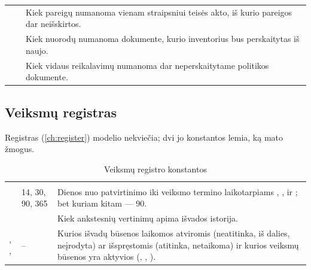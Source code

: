 \begin{xltabular}{\textwidth}{@{}L{44mm}L{19mm}Y@{}}
 &  & Kiek pareigų numanoma vienam straipsniui teisės akto, iš kurio pareigos dar neišskirtos. \\
 &  & Kiek nuorodų numanoma dokumente, kurio inventorius bus perskaitytas iš naujo. \\
 &  & Kiek vidaus reikalavimų numanoma dar neperskaitytame politikos dokumente. \\
\end{xltabular}


\subsection{Veiksmų registras}\label{sec:config:register}

Registras (\cref{ch:register}) modelio nekviečia; dvi jo konstantos lemia, ką mato žmogus.

\begin{xltabular}{\textwidth}{@{}L{44mm}L{19mm}Y@{}}
\caption{Veiksmų registro konstantos}\label{tab:config:register}\\
\toprule
{} &  &  \\
\midrule
\endfirsthead
\toprule
{} &  &  \\
\midrule
\endhead
\bottomrule
\endlastfoot
{} & 14, 30, 90, 365 & Dienos nuo patvirtinimo iki veiksmo termino laikotarpiams , ,  ir ; bet kuriam kitam --- 90. \\
 &  & Kiek ankstesnių vertinimų apima išvados istorija. \\
, ,  & -- & Kurios išvadų būsenos laikomos atviromis (neatitinka, iš dalies, neįrodyta) ar išspręstomis (atitinka, netaikoma) ir kurios veiksmų būsenos yra aktyvios (, , ). \\
\end{xltabular}


